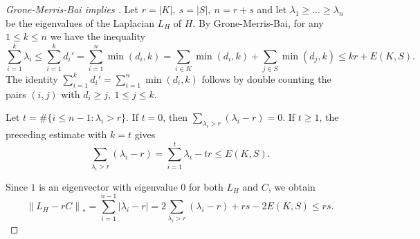 \documentclass[10pt,reqno]{amsart}
\theoremstyle{definition}
\theoremstyle{remark}
\numberwithin{equation}{section}
\newcommand{\norm}[1]{\left\| #1 \right\|}
\begin{document}
\begin{proof}[Grone-Merris-Bai implies ]
    Let $r=|K|,\ s=|S|,\ n=r+s$ and let $\lambda_1\ge \ldots\ge\lambda_n$ be the eigenvalues of the Laplacian $L_H$ of $H$. 
    By Grone-Merris-Bai, for any $1\le k\le n$ we have the inequality
    $$\sum\limits_{i=1}^{k}\lambda_i\le \sum\limits_{i=1}^{k}d_i'=\sum\limits_{i=1}^{n}\min(d_i,k)=\sum\limits_{i\in K}\min(d_i,k)+\sum\limits_{j \in S}\min(d_j,k)\le kr+E(K,S).$$
    The identity $\sum\limits_{i=1}^{k}d_i'=\sum\limits_{i=1}^{n}\min(d_i,k)$ follows by double counting the pairs $(i,j)$ with $ d_i\ge j,\ 1\le j\le k$.  

    Let \(t=\#\{i\le n-1:\lambda_i>r\}\). If \(t=0\), then
\(\sum_{\lambda_i>r}(\lambda_i-r)=0\). If \(t\ge 1\), the preceding estimate
with \(k=t\) gives
\[
\sum_{\lambda_i>r}(\lambda_i-r)
=
\sum_{i=1}^t \lambda_i-tr
\le E(K,S).
\]
    
    Since $1$ is an eigenvector with eigenvalue $0$ for both $L_H$ and $C$, we obtain
    $$\norm{L_H-rC}_*=\sum\limits_{i=1}^{n-1}|\lambda_i-r|=2\sum\limits_{\lambda_i>r}(\lambda_i-r)+rs-2E(K,S)\le rs.$$

\end{proof}
\end{document}
